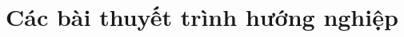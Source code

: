 \documentclass[14pt, a4paper]{article}
\numberwithin{equation}{section}
\numberwithin{figure}{section}
\numberwithin{dl}{section}
\numberwithin{md}{section}
\numberwithin{bd}{section}
\numberwithin{dn}{section}
\numberwithin{hq}{section}
\begin{document}
\begin{titlepage}





        \vfill %

    \end{titlepage}

    \cleardoublepage
    \tableofcontents
    \newpage
    \listoffigures
    \newpage
    \glsaddall 
    \renewcommand*{\glossaryname}{Danh mục các từ viết tắt}
    \renewcommand*{\acronymname}{Danh sách từ viết tắt}
    \renewcommand*{\entryname}{Viết tắt}
    \renewcommand*{\descriptionname}{Viết đầy đủ}
    \printnoidxglossary
    \cleardoublepage



    \nocite{*}


    \newpage

    \section{Các bài thuyết trình hướng nghiệp}
\end{document}
